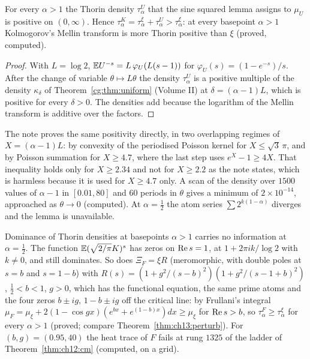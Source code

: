 \begin{theorem}\label{bp:thm:uniformU}
For every $\alpha>1$ the Thorin density $\tau_\alpha^U$ that the sine squared lemma assigns to $\mu_U$ is positive on $(0,\infty)$. Hence $\tau_\alpha^K=\tau_\alpha^\xi+\tau_\alpha^U>\tau_\alpha^\xi$: at every basepoint $\alpha>1$ Kolmogorov's Mellin transform is more Thorin positive than $\xi$ (proved, computed).
\end{theorem}

\begin{proof}
With $L=\log2$, $\mathbb{E} U^{-s}=L\,\varphi_U(L(s-1))$ for $\varphi_U(s)=(1-e^{-s})/s$. After the change of variable $\theta\mapsto L\theta$ the density $\tau_\alpha^U$ is a positive multiple of the density $\kappa_\delta$ of Theorem~\ref{cg:thm:uniform} (Volume II) at $\delta=(\alpha-1)L$, which is positive for every $\delta>0$. The densities add because the logarithm of the Mellin transform is additive over the factors.
\end{proof}

The note proves the same positivity directly, in two overlapping regimes of $X=(\alpha-1)L$: by convexity of the periodised Poisson kernel for $X\le\sqrt3\,\pi$, and by Poisson summation for $X\ge4.7$, where the last step uses $e^X-1\ge4X$. That inequality holds only for $X\ge2.34$ and not for $X\ge2.2$ as the note states, which is harmless because it is used for $X\ge4.7$ only. A scan of the density over $1500$ values of $\alpha-1$ in $[0.01,80]$ and $60$ periods in $\theta$ gives a minimum of $2\times10^{-14}$, approached as $\theta\to0$ (computed). At $\alpha=\frac12$ the atom series $\sum2^{k(1-\alpha)}$ diverges and the lemma is unavailable.

\begin{remark}\label{bp:rem:kkcal}
Dominance of Thorin densities at basepoints $\alpha>1$ carries no information at $\alpha=\frac12$. The function $\mathbb{E}(\sqrt{2/\pi}K)^s$ has zeros on $\operatorname{Re} s=1$, at $1+2\pi ik/\log2$ with $k\ne0$, and still dominates. So does $\Xi_F=\xi R$ (meromorphic, with double poles at $s=b$ and $s=1-b$) with $R(s)=(1+g^2/(s-b)^2)(1+g^2/(s-1+b)^2)$, $\frac12<b<1$, $g>0$, which has the functional equation, the same prime atoms and the four zeros $b\pm ig$, $1-b\pm ig$ off the critical line: by Frullani's integral $\mu_F=\mu_\xi+2(1-\cos gx)(e^{bx}+e^{(1-b)x})dx\ge\mu_\xi$ for $\operatorname{Re} s>b$, so $\tau^F_\alpha\ge\tau^\xi_\alpha$ for every $\alpha>1$ (proved; compare Theorem~\ref{thm:ch13:perturb}). For $(b,g)=(0.95,40)$ the heat trace of $F$ fails at rung $1325$ of the ladder of Theorem~\ref{thm:ch12:cm} (computed, on a grid).
\end{remark}

